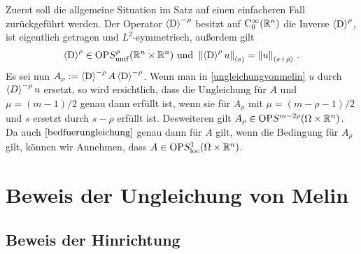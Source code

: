 Zuerst soll die allgemeine Situation im Satz auf einen einfacheren Fall zurückgeführt werden. Der Operator $\braket{\mathrm D}^{-\rho}$ besitzt auf $\mathrm C^\infty_0(\mathbb R^n)$ die Inverse $\braket{\mathrm D}^{\rho}$, ist eigentlich getragen und $L^2$-symmetrisch, außerdem gilt
\begin{align*}
\braket{\mathrm D}^\rho\in\mathrm{OP} S_\mathrm{unif}^\rho(\mathbb R^n\times\mathbb R^n)\text{ und }\left\lVert\braket{\mathrm D}^\rho u\right\rVert_{(s)}=\left\lVert u\right\rVert_{(s+\rho)}\,.
\end{align*}
Es sei nun $A_\rho:=\braket{\mathrm D}^{-\rho}A\braket{\mathrm D}^{-\rho}$. Wenn man in \eqref{ungleichungvonmelin} $u$ durch $\braket{D}^{-\rho}u$ ersetzt, so wird ersichtlich, dass die Ungleichung für $A$ und $\mu=(m-1)/2$ genau dann erfüllt ist, wenn sie für $A_\rho$ mit $\mu=(m-\rho-1)/2$ und $s$ ersetzt durch $s-\rho$ erfüllt ist. Desweiteren gilt $A_\rho\in \mathrm{OP}S^{m-2\rho}(\Omega\times\mathbb R^n)$. 
Da auch $\eqref{bedfuerungleichung}$ genau dann für $A$ gilt, wenn die Bedingung für $A_\rho$ gilt, können wir Annehmen, dass $A\in\mathrm{OP}S^1_{\rm loc}(\Omega\times\mathbb R^n)$.

\section{Beweis der Ungleichung von Melin}

\subsection{Beweis der Hinrichtung}

